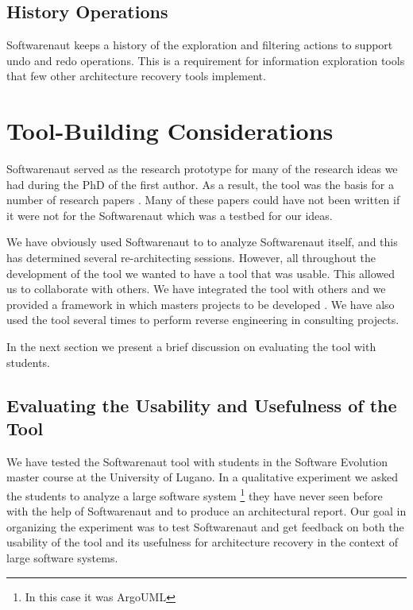 \documentclass[preprint,12pt]{elsarticle}
\begin{document}
\subsection {History Operations} Softwarenaut keeps a history of the exploration and filtering actions to support undo and redo operations. This is a requirement for information exploration tools \cite{shneid-eyes} that few other architecture recovery tools implement.


\section {Tool-Building Considerations}
\label {sec:disc}

Softwarenaut served as the research prototype for many of the research ideas we had during the PhD of the first author. As a result, the tool was the basis for a number of research papers \cite{lungu-cutedge, lungu-clust, lungu-packages, lungu-relevo}. Many of these papers could have not been written if it were not for the Softwarenaut which was a testbed for our ideas. 

We have obviously used Softwarenaut to to analyze Softwarenaut itself, and this has determined several re-architecting sessions. However, all throughout the development of the tool we wanted to have a tool that was usable. This allowed us to collaborate with others. We have integrated the tool with others \cite{lungu-clust, lungu-scico, nier-story} and we provided a framework in which masters projects to be developed \cite{boeckmann-mars}. We have also used the tool several times to perform reverse engineering in consulting projects.

In the next section we present a brief discussion on evaluating the tool with students.

\subsection {Evaluating the Usability and Usefulness of the Tool}
We have tested the Softwarenaut tool with students in the Software Evolution master course at the University of Lugano. In a qualitative experiment we asked the students to analyze a large software system \footnote{In this case it was ArgoUML} they have never seen before with the help of Softwarenaut and to produce an architectural report. Our goal in organizing the experiment was to test Softwarenaut and get feedback on both the usability of the tool and its usefulness for architecture recovery in the context of large software systems. 
\end{document}
